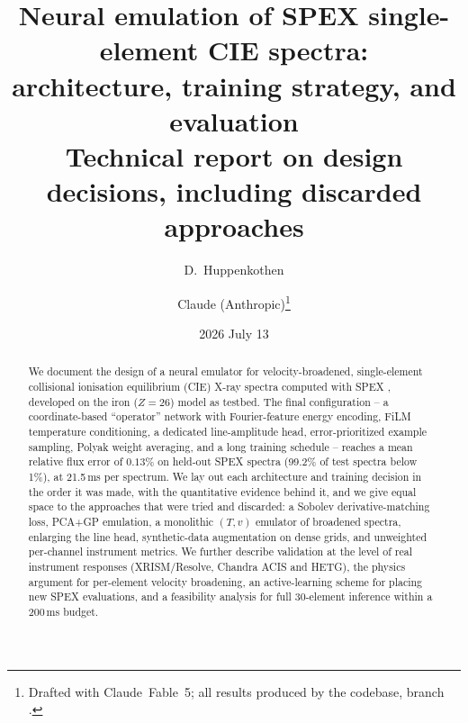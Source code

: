 \documentclass[11pt,a4paper]{article}
\title{Neural emulation of SPEX single-element CIE spectra:\\
architecture, training strategy, and evaluation\\
\large Technical report on design decisions, including discarded approaches}
\author{D.~Huppenkothen \and Claude (Anthropic)\thanks{Drafted with
Claude~Fable~5; all results produced by the \code{spexai} codebase,
branch \code{neural\_operator}.}}
\date{2026 July 13}
\begin{document}
\maketitle

\begin{abstract}
We document the design of a neural emulator for velocity-broadened,
single-element collisional ionisation equilibrium (CIE) X-ray spectra
computed with SPEX \citep{kaastra96}, developed on the iron ($Z=26$)
model as testbed. The final configuration -- a coordinate-based
``operator'' network with Fourier-feature energy encoding, FiLM
temperature conditioning, a dedicated line-amplitude head, error-prioritized
example sampling, Polyak weight averaging, and a long training schedule --
reaches a mean relative flux error of $0.13\%$ on held-out SPEX spectra
(99.2\% of test spectra below 1\%), at 21.5\,ms per spectrum. We lay out
each architecture and training decision in the order it was made, with
the quantitative evidence behind it, and we give equal space to the
approaches that were tried and discarded: a Sobolev derivative-matching
loss, PCA+GP emulation, a monolithic $(T,v)$ emulator of broadened
spectra, enlarging the line head, synthetic-data augmentation on dense
grids, and unweighted per-channel instrument metrics. We further
describe validation at the level of real instrument responses
(XRISM/Resolve, Chandra ACIS and HETG), the physics argument for
per-element velocity broadening, an active-learning scheme for placing
new SPEX evaluations, and a feasibility analysis for full 30-element
inference within a 200\,ms budget.
\end{abstract}
\end{document}
